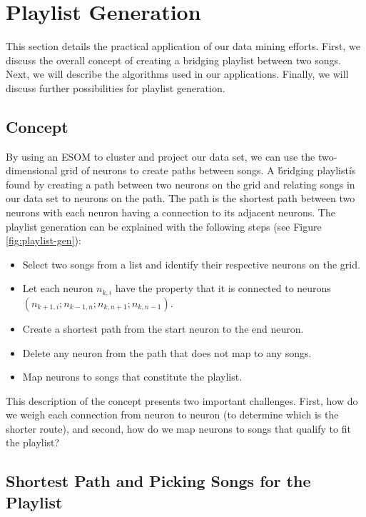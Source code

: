 \section{Playlist Generation} %
\label{sec:playlist_generation}

This section details the practical application of our data mining efforts. First, we discuss
the overall concept of creating a bridging playlist between two songs. Next, we will describe the algorithms used in our applications. Finally, we will discuss further possibilities for playlist generation.

\subsection{Concept}
By using an ESOM to cluster and project our data set, we can use the two-dimensional grid of neurons to create paths between songs. A \'bridging playlist\' is found by creating a path between two neurons on the grid and relating songs in our data set to neurons on the path. The path is the shortest path between two neurons with each neuron having a connection to its adjacent neurons. The playlist generation can be explained with the following steps (see Figure \ref{fig:playlist-gen}):
\begin{itemize}
\item Select two songs from a list and identify their respective neurons on the grid.
\item Let each neuron $ n_{k,i} $  have the property that it is connected to neurons $ ( n_{k+1,i} ; n_{k-1,n} ; n_{k,n+1} ; n_{k,n-1} ) $.
\item Create a shortest path from the start neuron to the end neuron.
\item Delete any neuron from the path that does not map to any songs.
\item Map neurons to songs that constitute the playlist.
\end{itemize}
\noindent
This description of the concept presents two important challenges. First, how do we weigh each connection from neuron to neuron (to determine which is the shorter route), and second, how do we map neurons to songs that qualify to fit the playlist?

\subsection{Shortest Path and Picking Songs for the Playlist}

